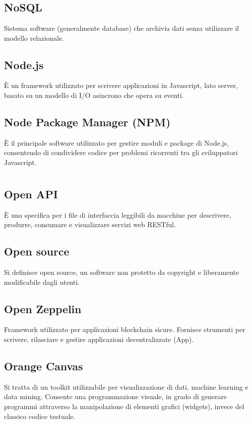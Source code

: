 \section[N]{}
	\subsection*{NoSQL}
	Sistema software (generalmente database) che archivia dati senza utilizzare il modello relazionale.
	\subsection*{Node.js}
	È un framework utilizzato per scrivere applicazioni in Javascript, lato server, basato su un modello di I/O asincrono che opera su eventi.
	\subsection*{Node Package Manager (NPM)}
	È il principale software utilizzato per gestire moduli e package di Node.js, consentendo di condividere codice per problemi ricorrenti tra gli sviluppatori Javascript.
\pagebreak
\section[O]{}
	\subsection*{Open API}
	È una specifica per i file di interfaccia leggibili da macchine per descrivere, produrre, consumare e visualizzare servizi web RESTful.
	\subsection*{Open source}
	Si definisce open source, un software non protetto da copyright e liberamente modificabile dagli utenti.
	\subsection*{Open Zeppelin}
	Framework utilizzato per applicazioni blockchain sicure. Fornisce strumenti per scrivere, rilasciare e gestire applicazioni decentralizzate (\DJ{}App).
	\subsection*{Orange Canvas}
	Si tratta di un toolkit utilizzabile per visualizzazione di dati, machine learning e data mining. Consente una programmazione visuale, in grado di generare programmi attraverso la manipolazione di elementi grafici (widgets), invece del classico codice testuale.
\pagebreak
